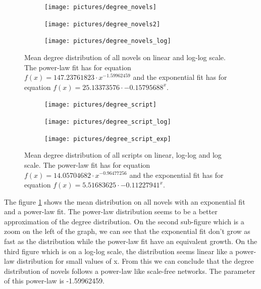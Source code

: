 \documentclass[a4paper, 12pt]{report}
\begin{document}
\begin{figure}
\begin{subfigure}{.49\textwidth}
\centering
\texttt{[image: pictures/degree\_novels]}
\end{subfigure}
\hfill
\begin{subfigure}{.49\textwidth}
\centering
\texttt{[image: pictures/degree\_novels2]}
\end{subfigure}
\hfill
\begin{subfigure}{.49\textwidth}
\centering
\texttt{[image: pictures/degree\_novels\_log]}
\end{subfigure}
\caption{Mean degree distribution of all novels on linear and log-log scale. The power-law fit has for equation $f(x) =  147.23761823  \cdot x^{-1.59962459}$ and the exponential fit has for equation $f(x) = 25.13373576 \cdot -0.15795688^x$.  }
\label{cumulated_degree_novel}
\end{figure}

\begin{figure}
\begin{subfigure}{.49\textwidth}
\centering
\texttt{[image: pictures/degree\_script]}
\end{subfigure}
\hfill
\begin{subfigure}{.49\textwidth}
\centering
\texttt{[image: pictures/degree\_script\_log]}
\end{subfigure}
\begin{subfigure}{.49\textwidth}
\centering
\texttt{[image: pictures/degree\_script\_exp]}
\end{subfigure}
\caption{Mean degree distribution of all scripts on linear, log-log  and log scale. The power-law fit has for equation $f(x) = 14.05704682 \cdot x^{-0.96477256}$ and the exponential fit has for equation $f(x) = 5.51683625 \cdot -0.11227941^x$. }
\label{cumulated_degree_script}
\end{figure}

The figure \ref{cumulated_degree_novel} shows the mean distribution on all novels with an exponential fit and a power-law fit. The  power-law distribution seems to be a better approximation of the degree distribution. On the second sub-figure which is a zoom on the left of the graph, we can see that the exponential fit don't grow as fast as the distribution while the  power-law fit have an equivalent growth. On the third figure which is on a log-log scale, the distribution seems linear like a  power-law distribution for small values of x. From this we can conclude that the degree distribution of novels follows a power-law like scale-free networks. The parameter of this power-law is -1.59962459.\\
\end{document}
